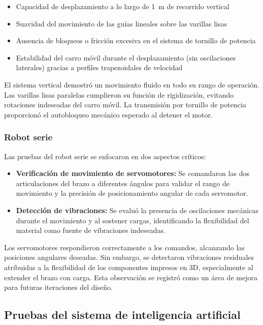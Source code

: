\begin{itemize}
    \item Capacidad de desplazamiento a lo largo de 1~m de recorrido vertical
    \item Suavidad del movimiento de las guías lineales sobre las varillas lisas
    \item Ausencia de bloqueos o fricción excesiva en el sistema de tornillo de potencia
    \item Estabilidad del carro móvil durante el desplazamiento (sin oscilaciones laterales) gracias a perfiles trapezoidales de velocidad
\end{itemize}

El sistema vertical demostró un movimiento fluido en todo su rango de operación. Las varillas lisas paralelas cumplieron su función de rigidización, evitando rotaciones indeseadas del carro móvil. La transmisión por tornillo de potencia proporcionó el autobloqueo mecánico esperado al detener el motor.

\subsubsection{Robot serie}

Las pruebas del robot serie se enfocaron en dos aspectos críticos:

\begin{itemize}
    \item \textbf{Verificación de movimiento de servomotores:} Se comandaron las dos articulaciones del brazo a diferentes ángulos para validar el rango de movimiento y la precisión de posicionamiento angular de cada servomotor.
    \item \textbf{Detección de vibraciones:} Se evaluó la presencia de oscilaciones mecánicas durante el movimiento y al sostener cargas, identificando la flexibilidad del material como fuente de vibraciones indeseadas.
\end{itemize}

Los servomotores respondieron correctamente a los comandos, alcanzando las posiciones angulares deseadas. Sin embargo, se detectaron vibraciones residuales atribuidas a la flexibilidad de los componentes impresos en 3D, especialmente al extender el brazo con carga. Esta observación se registró como un área de mejora para futuras iteraciones del diseño.

\subsection{Pruebas del sistema de inteligencia artificial}


